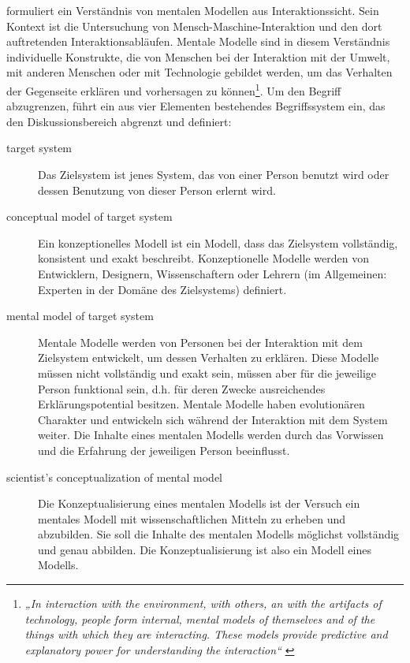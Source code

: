 \citet{Norman83a} formuliert ein Verständnis von mentalen Modellen aus Interaktionssicht. Sein Kontext ist die Untersuchung von Mensch-Maschine-Interaktion und den dort auftretenden Interaktionsabläufen. Mentale Modelle sind in diesem Verständnis individuelle Konstrukte, die von Menschen bei der Interaktion mit der Umwelt, mit anderen Menschen oder mit Technologie gebildet werden, um das Verhalten der Gegenseite erklären und vorhersagen zu können\footnote{\emph{„In interaction with the environment, with others, an with the artifacts of technology, people form internal, mental models of themselves and of the things with which they are interacting. These models provide predictive and explanatory power for understanding the interaction“} \citep{Norman83a}}. Um den Begriff abzugrenzen, führt \citeauthor{Norman83a} ein aus vier Elementen bestehendes Begriffssystem ein, das den Diskussionsbereich abgrenzt und definiert:
\begin{description}
	\item[target system] Das Zielsystem ist jenes System, das von einer Person benutzt wird oder dessen Benutzung von dieser Person erlernt wird.
	\item[conceptual model of target system] Ein konzeptionelles Modell ist ein Modell, dass das Zielsystem vollständig, konsistent und exakt beschreibt. Konzeptionelle Modelle werden von Entwicklern, Designern, Wissenschaftern oder Lehrern (im Allgemeinen: Experten in der Domäne des Zielsystems) definiert.
	\item[mental model of target system] Mentale Modelle werden von Personen bei der Interaktion mit dem Zielsystem entwickelt, um dessen Verhalten zu erklären. Diese Modelle müssen nicht vollständig und exakt sein, müssen aber für die jeweilige Person funktional sein, d.h. für deren Zwecke ausreichendes Erklärungspotential besitzen. Mentale Modelle haben evolutionären Charakter und entwickeln sich während der Interaktion mit dem System weiter. Die Inhalte eines mentalen Modells werden durch das Vorwissen und die Erfahrung der jeweiligen Person beeinflusst.
	\item[scientist's conceptualization of mental model] Die Konzeptualisierung eines mentalen Modells ist der Versuch ein mentales Modell mit wissenschaftlichen Mitteln zu erheben und abzubilden. Sie soll die Inhalte des mentalen Modells möglichst vollständig und genau abbilden. Die Konzeptualisierung ist also ein Modell eines Modells.
\end{description}

